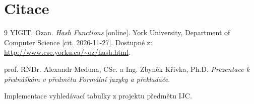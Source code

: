 \documentclass[12pt, a4paper]{article}
\begin{document}
\section{Citace}

{
\renewcommand{\section}[2]{}%
\begin{thebibliography}{9}
    YIGIT, Ozan. \textit{Hash Functions} [online]. York University, Department of Computer Science [cit. 2026-11-27]. Dostupné z: \url{http://www.cse.yorku.ca/~oz/hash.html}.

    prof. RNDr. Alexandr Meduna, CSc. a Ing. Zbyněk Křivka, Ph.D. \textit{Prezentace k přednáškám v předmětu Formální jazyky a překladače}.

    Implementace vyhledávací tabulky z projektu předmětu IJC.
\end{thebibliography}
}
\end{document}
